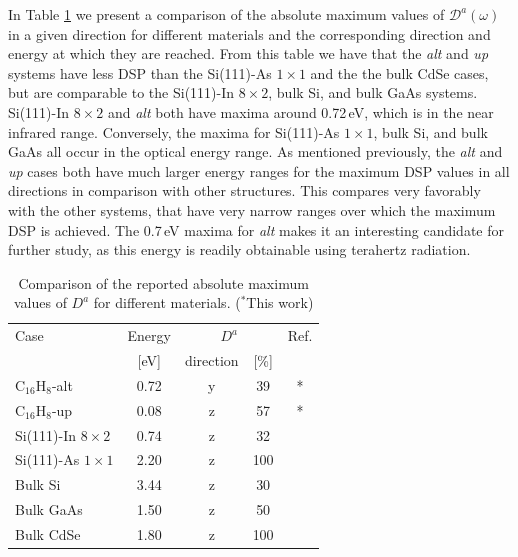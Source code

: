 \documentclass[pss]{wiley2sp} %
\begin{document}
In Table \ref{tab:dacomp} we present a comparison of the absolute maximum
values of $\mathcal{D}^{a}(\omega)$ in a given direction for different
materials and the corresponding direction and energy at which they are
reached. From this table we have that the \emph{alt} and \emph{up} systems
have less DSP than the Si(111)-As $1\times1$ and the the bulk CdSe cases, but
are comparable to the Si(111)-In $8\times2$, bulk Si, and bulk GaAs systems.
Si(111)-In $8\times2$ and \emph{alt} both have maxima around 0.72\,eV, which
is in the near infrared range. Conversely, the maxima for Si(111)-As
$1\times1$, bulk Si, and bulk GaAs all occur in the optical energy range. As
mentioned previously, the \emph{alt} and \emph{up} cases both have much larger
energy ranges for the maximum DSP values in all directions in comparison with
other structures. This compares very favorably with the other systems, that
have very narrow ranges over which the maximum DSP is achieved. The 0.7\,eV
maxima for \emph{alt} makes it an interesting candidate for further study, as
this energy is readily obtainable using terahertz radiation.
\begin{table}[b]
\sidecaption
\begin{tabular}{lcccc}
\hline
\hline
Case & Energy &  \multicolumn{2}{c}{$D^{a}$} &  Ref.\\
\cline{3-4}   & [eV]   & direction & [\%] \\
\hline
C$_{16}$H$_{8}$-alt    & 0.72 & y & 39  & * \\
C$_{16}$H$_{8}$-up     & 0.08 & z & 57  & * \\
Si(111)-In $8\times2$  & 0.74 & z & 32  & \cite{arzatePRB14}\\
Si(111)-As $1\times1$  & 2.20 & z & 100 & \cite{mendozaPRB12}\\
Bulk Si                & 3.44 & z & 30  & \cite{nastosPRB07}\\
Bulk GaAs              & 1.50 & z & 50  & \cite{nastosPRB07,bhatPRB05}\\
Bulk CdSe              & 1.80 & z & 100 & \cite{nastosPRB07}\\
\hline
\hline
\end{tabular}
\caption[]{Comparison of the reported absolute maximum values of {$D^{a}$} for
different materials. ($^{*}$This work)}
\label{tab:dacomp}
\end{table}
\end{document}
